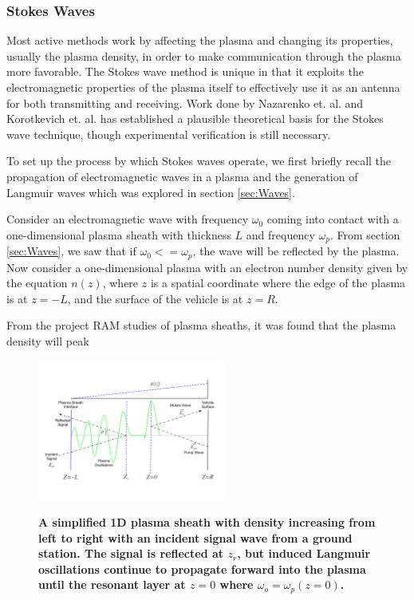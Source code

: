 \documentclass[twocolumn]{article}
\begin{document}
		\subsubsection*{Stokes Waves}
			Most active methods work by affecting the plasma and changing its properties, usually the plasma density, in order to make communication through the plasma more favorable.
			The Stokes wave method is unique in that it exploits the electromagnetic properties of the plasma itself to effectively use it as an antenna for both transmitting and receiving.
			Work done by Nazarenko et. al. and Korotkevich et. al. has established a plausible theoretical basis for the Stokes wave technique, though experimental verification is still necessary.\cite{nazarenko_communication_1994}\cite{korotkevich_communication_2007}
			
			To set up the process by which Stokes waves operate, we first briefly recall the propagation of electromagnetic waves in a plasma and the generation of Langmuir waves which was explored in section \ref{sec:Waves}.
			
			Consider an electromagnetic wave with frequency $\omega_0$ coming into contact with a one-dimensional plasma sheath with thickness $L$ and frequency $\omega_p$.
			From section \ref{sec:Waves}, we saw that if $\omega_0 <= \omega_p$, the wave will be reflected by the plasma.
			Now consider a one-dimensional plasma with an electron number density given by the equation $n(z)$, where $z$ is a spatial coordinate where the edge of the plasma is at $z=-L$, and the surface of the vehicle is at $z=R$.
			
			From the project RAM studies of plasma sheaths, it was found that the plasma density will peak
			
			\begin{figure}[t]
				\centering
				\includegraphics[width = 0.55\textwidth]{Images/StokesDiagram.png}
				\label{subfig:Stokes2}
				\caption{\textbf{A simplified 1D plasma sheath with density increasing from left to right with an incident signal wave from a ground station. The signal is reflected at $z_r$, but induced Langmuir oscillations continue to propagate forward into the plasma until the resonant layer at $z=0$ where $\omega_o = \omega_p(z=0)$.}}
				\label{fig:StokesDiagram}
			\end{figure}
			
\end{document}
